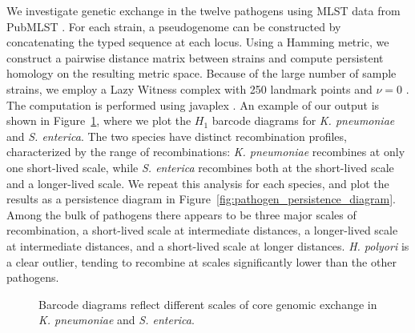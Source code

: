 We investigate genetic exchange in the twelve pathogens using MLST data from PubMLST \cite{Jolley:2010gf}.
For each strain, a pseudogenome can be constructed by concatenating the typed sequence at each locus.
Using a Hamming metric, we construct a pairwise distance matrix between strains and compute persistent homology on the resulting metric space.
Because of the large number of sample strains, we employ a Lazy Witness complex with 250 landmark points and $\nu=0$ \cite{deSilva:2004tg}.
The computation is performed using javaplex \cite{Tausz:2011}.
An example of our output is shown in Figure~\ref{fig:pathogen_barcodes}, where we plot the $H_1$ barcode diagrams for \emph{K. pneumoniae} and \emph{S. enterica}.
The two species have distinct recombination profiles, characterized by the range of recombinations: \emph{K. pneumoniae} recombines at only one short-lived scale, while \emph{S. enterica} recombines both at the short-lived scale and a longer-lived scale.
We repeat this analysis for each species, and plot the results as a persistence diagram in Figure~\ref{fig:pathogen_persistence_diagram}.
Among the bulk of pathogens there appears to be three major scales of recombination, a short-lived scale at intermediate distances, a longer-lived scale at intermediate distances, and a short-lived scale at longer distances.
\emph{H. polyori} is a clear outlier, tending to recombine at scales significantly lower than the other pathogens.

\begin{figure}
    \centering
    \caption[Core genome exchange in \emph{K. pneumoniae} and \emph{S. enterica}]{Barcode diagrams reflect different scales of core genomic exchange in \emph{K. pneumoniae} and \emph{S. enterica}.}
    \label{fig:pathogen_barcodes}
\end{figure}

